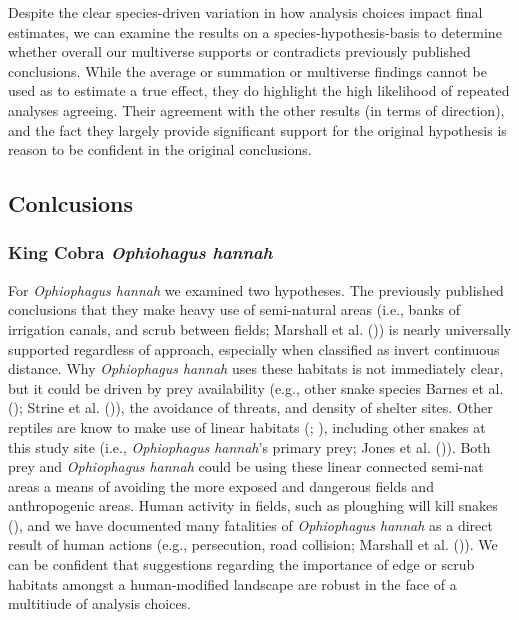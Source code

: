 \documentclass[10pt,a4paper]{article}
\begin{document}
Despite the clear species-driven variation in how analysis choices impact final estimates, we can examine the results on a species-hypothesis-basis to determine whether overall our multiverse supports or contradicts previously published conclusions.
While the average or summation or multiverse findings cannot be used as to estimate a true effect, they do highlight the high likelihood of repeated analyses agreeing.
Their agreement with the other results (in terms of direction), and the fact they largely provide significant support for the original hypothesis is reason to be confident in the original conclusions.

\subsection{Conlcusions}\label{conlcusions}

\subsubsection{\texorpdfstring{King Cobra \emph{Ophiohagus hannah}}{King Cobra Ophiohagus hannah}}\label{king-cobra-ophiohagus-hannah}

For \emph{Ophiophagus hannah} we examined two hypotheses.
The previously published conclusions that they make heavy use of semi-natural areas (i.e., banks of irrigation canals, and scrub between fields; Marshall et al. ()) is nearly universally supported regardless of approach, especially when classified as invert continuous distance.
Why \emph{Ophiophagus hannah} uses these habitats is not immediately clear, but it could be driven by prey availability (e.g., other snake species Barnes et al. (); Strine et al. ()), the avoidance of threats, and density of shelter sites.
Other reptiles are know to make use of linear habitats (; ), including other snakes at this study site (i.e., \emph{Ophiophagus hannah}'s primary prey; Jones et al. ()).
Both prey and \emph{Ophiophagus hannah} could be using these linear connected semi-nat areas a means of avoiding the more exposed and dangerous fields and anthropogenic areas.
Human activity in fields, such as ploughing will kill snakes (), and we have documented many fatalities of \emph{Ophiophagus hannah} as a direct result of human actions (e.g., persecution, road collision; Marshall et al. ()).
We can be confident that suggestions regarding the importance of edge or scrub habitats amongst a human-modified landscape are robust in the face of a multitiude of analysis choices.
\end{document}
